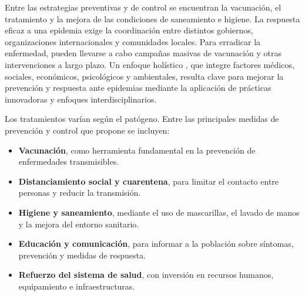 Entre las estrategias preventivas y de control se encuentran la vacunación, el tratamiento y la mejora de las condiciones de saneamiento e higiene. La respuesta eficaz a una epidemia exige la coordinación entre distintos gobiernos, organizaciones internacionales y comunidades locales. Para erradicar la enfermedad, pueden llevarse a cabo campañas masivas de vacunación y otras intervenciones a largo plazo. Un enfoque holístico \cite{tsagkarliotis2023holistic}, que integre factores médicos, sociales, económicos, psicológicos y ambientales, resulta clave para mejorar la prevención y respuesta ante epidemias mediante la aplicación de prácticas innovadoras y enfoques interdisciplinarios. 

Los tratamientos varían según el patógeno. Entre las principales medidas de prevención y control que propone \cite{ministeriosanidad2021} se incluyen:
\begin{itemize}
  \item \textbf{Vacunación}, como herramienta fundamental en la prevención de enfermedades transmisibles.
  \item \textbf{Distanciamiento social y cuarentena}, para limitar el contacto entre personas y reducir la transmisión.
  \item \textbf{Higiene y saneamiento}, mediante el uso de mascarillas, el lavado de manos y la mejora del entorno sanitario.
  \item \textbf{Educación y comunicación}, para informar a la población sobre síntomas, prevención y medidas de respuesta.
  \item \textbf{Refuerzo del sistema de salud}, con inversión en recursos humanos, equipamiento e infraestructuras.
\end{itemize}

